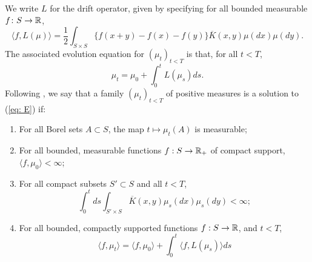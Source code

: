  We write $L$ for the drift operator, given by specifying for all bounded measurable $f\colon S \rightarrow \mathbb{R}$,  \begin{equation} \label{eq: drift wo gel}
    \langle f,L(\mu)\rangle=\frac{1}{2}\int_{S\times S}\{f(x+y)-f(x)-f(y)\}\overline{K}(x,y)\mu(dx)\mu(dy).
\end{equation} The associated evolution equation for $(\mu_t)_{t<T}$ is that, for all $t<T$,
\begin{equation}
    \tag{E-G}\label{eq: E} \mu_t =  \mu_0 +\int_0^t L(\mu_s) ds.
\end{equation} Following \cite{N00}, we say that a family $(\mu_t)_{t<T}$ of positive measures is a solution to (\ref{eq: E}) if: \begin{enumerate}[label=\roman{*}).] \item For all Borel sets $A\subset S$, the map $t\mapsto \mu_t(A)$ is measurable; \item For all bounded, measurable functions $f:S\rightarrow \mathbb{R}_+$ of compact support, $\langle f, \mu_0\rangle<\infty$; \item For all compact subsets $S'\subset S$ and all $t<T$, \begin{equation} \int_0^t ds \int_{S'\times S}\overline{K}(x,y)\mu_s(dx)\mu_s(dy)<\infty; \end{equation}  \item For all bounded, compactly supported functions $f:S\rightarrow \mathbb{R}$, and $t<T$, \begin{equation}
    \langle f, \mu_t \rangle =  \langle f,\mu_0\rangle +\int_0^t \langle f, L(\mu_s)\rangle ds
\end{equation} \end{enumerate} 
